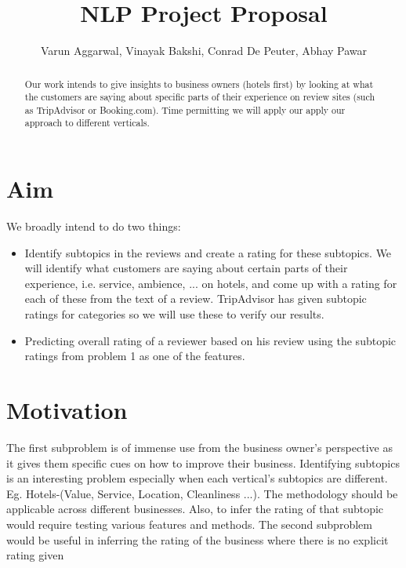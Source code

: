 \documentclass[preprint,10pt]{elsarticle}
\begin{document}
\begin{frontmatter}


\title{NLP Project Proposal}

\author{Varun Aggarwal, Vinayak Bakshi, Conrad De Peuter, Abhay Pawar}

\address{Columbia University, New York, NY, USA}


\begin{abstract}
Our work intends to give insights to business owners (hotels first) by looking at what the customers are saying about specific parts of their experience on review sites (such as TripAdvisor or Booking.com). Time permitting we will apply our apply our approach to different verticals.

\end{abstract}
\end{frontmatter}

\section{Aim}


We broadly intend to do two things:

\begin{itemize}
\item
Identify subtopics in the reviews and create a rating for these subtopics. We will identify what customers are saying about certain parts of their experience, i.e. service, ambience, ... on hotels, and come up with a rating for each of these from the text of a review. TripAdvisor has given subtopic ratings for categories so we will use these to verify our results.

\item
Predicting overall rating of a reviewer based on his review using the subtopic ratings from problem 1 as one of the features.


\end{itemize}

\section{Motivation}
The first subproblem is of immense use from the business owner's perspective as it gives them specific cues on how to improve their business. Identifying subtopics is an interesting problem especially when each vertical's subtopics are different. Eg. Hotels-(Value, Service, Location, Cleanliness ...). The methodology should be applicable across different businesses. Also, to infer the rating of that subtopic would require testing various features and methods.
The second subproblem would be useful in inferring the rating of the business where there is no explicit rating given
\end{document}
